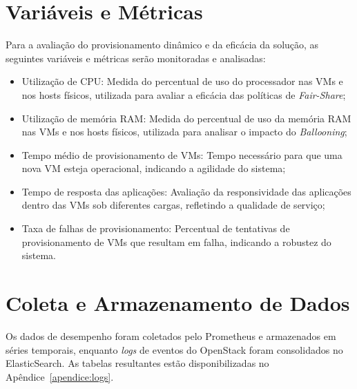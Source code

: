 \section{Variáveis e Métricas}
Para a avaliação do provisionamento dinâmico e da eficácia da solução, as seguintes variáveis e métricas serão monitoradas e analisadas:
\begin{itemize}
\item Utilização de CPU: Medida do percentual de uso do processador nas VMs e nos hosts físicos, utilizada para avaliar a eficácia das políticas de \textit{Fair-Share};
\item Utilização de memória RAM: Medida do percentual de uso da memória RAM nas VMs e nos hosts físicos, utilizada para analisar o impacto do \textit{Ballooning};
\item Tempo médio de provisionamento de VMs: Tempo necessário para que uma nova VM esteja operacional, indicando a agilidade do sistema;
\item Tempo de resposta das aplicações: Avaliação da responsividade das aplicações dentro das VMs sob diferentes cargas, refletindo a qualidade de serviço;
\item Taxa de falhas de provisionamento: Percentual de tentativas de provisionamento de VMs que resultam em falha, indicando a robustez do sistema.
\end{itemize}

\section{Coleta e Armazenamento de Dados}
Os dados de desempenho foram coletados pelo Prometheus e armazenados em séries temporais, enquanto \textit{logs} de eventos do OpenStack foram consolidados no ElasticSearch. As tabelas resultantes estão disponibilizadas no Apêndice~\ref{apendice:logs}.